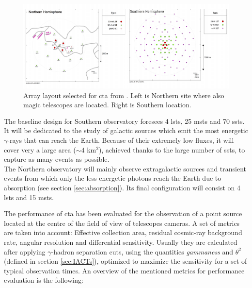 \documentclass[main.tex]{subfiles}
\begin{document}
\begin{figure}
\centering
 \includegraphics[width=1\textwidth]{Pictures/Array-Layouts.pdf}
  \caption{Array layout selected for \gls{cta} from \cite{CTAPerformance}. Left is Northern site where also \gls{magic} telescopes are located. Right is Southern location.}
    \label{fig:arraylayout}
\end{figure}

The baseline design for Southern observatory foresees 4 \glspl{lst}, 25 \glspl{mst} and 70 \glspl{sst}. It will be dedicated to the study of galactic sources which emit the most energetic $\gamma$-rays that can reach the Earth. Because of their extremely low fluxes, it will cover very a large area ($\sim4$ km$^2$), achieved thanks to the large number of \glspl{sst}, to capture as many events as possible.\\
The Northern observatory will mainly observe extragalactic sources and transient events from which only the less energetic photons reach the Earth due to absorption (see section \ref{sec:absorption}). Its final configuration will consist on 4 \glspl{lst} and 15 \glspl{mst}.

The performance of \gls{cta} has been evaluated for the observation of a point source located at the centre of the field of view of telescopes cameras. A set of metrics are taken into account: Effective collection area, residual cosmic-ray background rate, angular resolution and differential sensitivity. Usually they are calculated after applying $\gamma$-hadron separation cuts, using the quantities \textit{gammaness} and $\theta^2$ (defined in section \ref{sec:IACTs}), optimized to maximize the sensitivity for a set of typical observation times.
An overview of the mentioned metrics for performance evaluation is the following:\\
\end{document}
